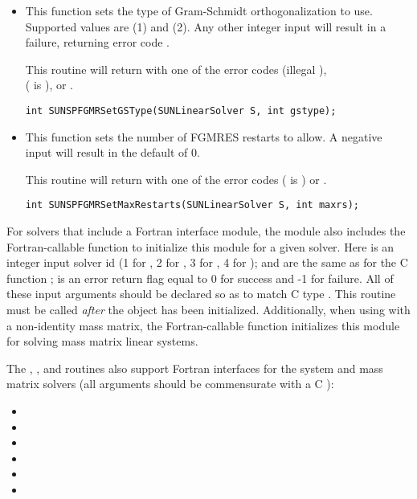 \begin{itemize}
\item {}

  This function sets the type of Gram-Schmidt orthogonalization to
  use.  Supported values are  (1) and
   (2).  Any other integer input will result in a
  failure, returning error code .

  This routine will return with one of the error codes
   (illegal ), \\ \noindent
   ( is ), or .
  
  \verb|int SUNSPFGMRSetGSType(SUNLinearSolver S, int gstype);|



\item {}

  This function sets the number of FGMRES restarts to 
  allow.  A negative input will result in the default of 0.

  This routine will return with one of the error codes
   ( is ) or .
  
  \verb|int SUNSPFGMRSetMaxRestarts(SUNLinearSolver S, int maxrs);|

\end{itemize}
For solvers that include a Fortran interface module, the
{\sunlinsolspfgmr} module also includes the Fortran-callable
function  to initialize
this {\sunlinsolspfgmr} module for a given {\sundials} solver.
Here  is an integer input solver id (1 for {\cvode}, 2 for {\ida}, 3
for {\kinsol}, 4 for {\arkode});  and  are the
same as for the C function ;  is an error return
flag equal to 0 for success and -1 for failure.  All of these input
arguments should be declared so as to match C type .  This
routine must be called \emph{after} the {\nvector} object has been
initialized.  Additionally, when using {\arkode} with a non-identity
mass matrix, the Fortran-callable
function  initializes this 
{\sunlinsolspfgmr} module for solving mass matrix linear systems.

The , , and
 routines also support Fortran interfaces
for the system and mass matrix solvers (all arguments should be
commensurate with a C ): 
\begin{itemize}
\item {}
\item {}
\item {}
\item {}
\item {}
\item {}
\end{itemize}
